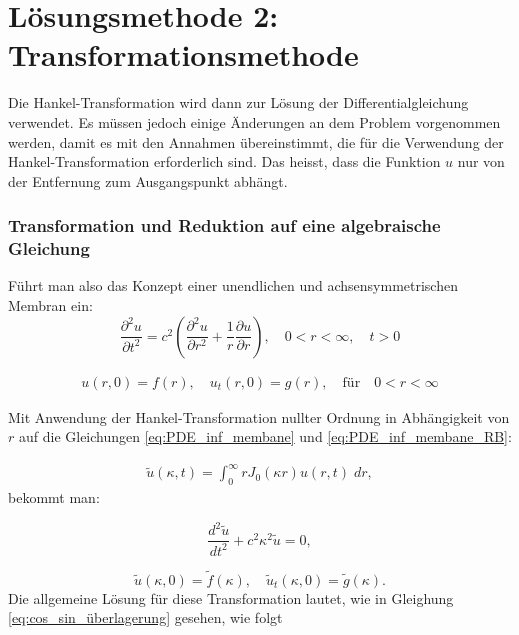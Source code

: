 %
%
%
\section{Lösungsmethode 2: Transformationsmethode
\label{kreismembran:section:teil3}}
Die Hankel-Transformation wird dann zur Lösung der Differentialgleichung verwendet. Es müssen jedoch einige Änderungen an dem Problem vorgenommen werden, damit es mit den Annahmen übereinstimmt, die für die Verwendung der Hankel-Transformation erforderlich sind. Das heisst, dass die Funktion $u$ nur von der Entfernung zum Ausgangspunkt abhängt. 

\subsubsection{Transformation und Reduktion auf eine algebraische Gleichung\label{subsub:transf_reduktion}}
Führt man also das Konzept einer unendlichen und achsensymmetrischen Membran ein:
\begin{equation*}
	\frac{\partial^2u}{\partial t^2}
	=
	c^2  \left(\frac{\partial^2 u}{\partial r^2}
	+
	\frac{1}{r}
	\frac{\partial u}{\partial r} \right), \quad 0<r<\infty, \quad t>0
	\label{eq:PDE_inf_membane}
\end{equation*}

\begin{align}
	u(r,0)=f(r), \quad u_t(r,0) = g(r), \quad \text{für} \quad 0<r<\infty
	\label{eq:PDE_inf_membane_RB}
\end{align}

Mit Anwendung der Hankel-Transformation nullter Ordnung in Abhängigkeit von $r$ auf die Gleichungen \eqref{eq:PDE_inf_membane} und \eqref{eq:PDE_inf_membane_RB}:

\begin{align}
	\tilde{u}(\kappa,t)=\int_{0}^{\infty}r J_0(\kappa r)u(r,t) \; dr,
\end{align}
bekommt man:

\begin{equation*}
	\frac{d^2 \tilde{u}}{dt^2} + c^2\kappa^2\tilde{u}=0,
\end{equation*}

\begin{equation*}
	\tilde{u}(\kappa,0)=\tilde{f}(\kappa), \quad 
	\tilde{u}_t(\kappa,0)=\tilde{g}(\kappa).
\end{equation*}
Die allgemeine Lösung für diese Transformation lautet, wie in Gleighung \eqref{eq:cos_sin_überlagerung} gesehen, wie folgt

